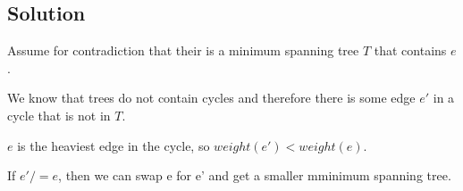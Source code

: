 \subsection*{Solution}

Assume for contradiction that their is a minimum spanning tree $T$ that contains $e$.

We know that trees do not contain cycles and therefore there is some edge $e'$ in a cycle that is not in $T$.

$e$ is the heaviest edge in the cycle, so $weight(e') < weight(e)$.

If $e' /= e$, then we can swap e for e' and get a smaller mminimum spanning tree.
